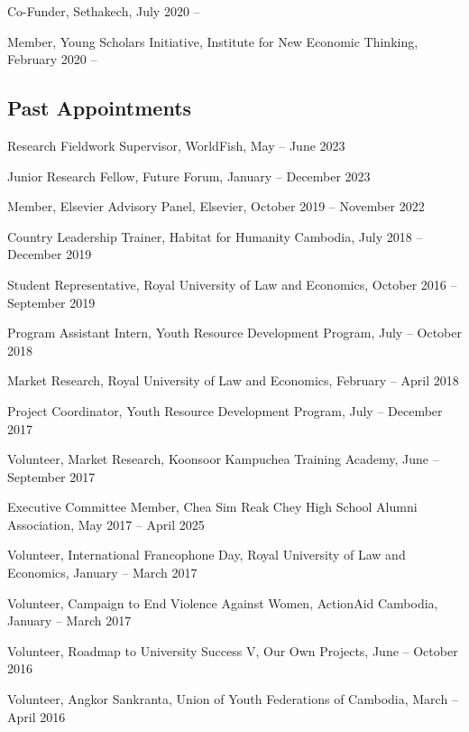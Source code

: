 \documentclass[10pt,a4paper]{article}
\begin{document}
	Co-Funder, Sethakech, July 2020 --
	
	Member, Young Scholars Initiative, Institute for New Economic Thinking, February 2020 --

\subsection*{Past Appointments}

	
	Research Fieldwork Supervisor, WorldFish, May -- June 2023

	Junior Research Fellow, Future Forum, January -- December 2023
	
	Member, Elsevier Advisory Panel, Elsevier, October 2019 -- November 2022
	
	Country Leadership Trainer, Habitat for Humanity Cambodia, July 2018 -- December 2019
	
	Student Representative, Royal University of Law and Economics, October 2016 -- September 2019
	
	Program Assistant Intern, Youth Resource Development Program, July -- October 2018
	
	Market Research, Royal University of Law and Economics, February -- April 2018
	
	Project Coordinator, Youth Resource Development Program, July -- December 2017
	
	Volunteer, Market Research, Koonsoor Kampuchea Training Academy, June -- September 2017
	
	Executive Committee Member, Chea Sim Reak Chey High School Alumni Association, May 2017 – April 2025
	
	Volunteer, International Francophone Day,  Royal University of Law and Economics, January -- March 2017
	
	Volunteer, Campaign to End Violence Against Women, ActionAid Cambodia, January -- March 2017
	
	Volunteer, Roadmap to University Success V, Our Own Projects, June -- October 2016
	
	Volunteer, Angkor Sankranta, Union of Youth Federations of Cambodia, March -- April 2016



\end{document}
